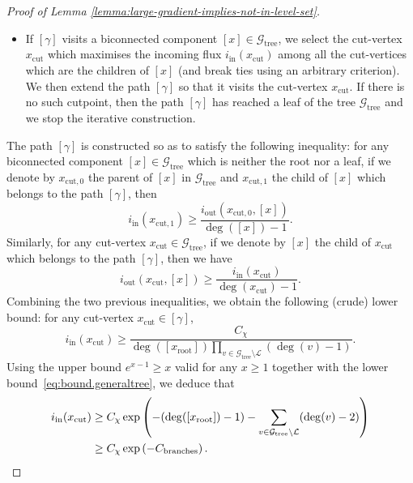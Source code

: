 \documentclass[12pt]{amsart}
\numberwithin{equation}{section}
\begin{document}
\begin{proof}[Proof of Lemma \ref{lemma:large-gradient-implies-not-in-level-set}]
\begin{itemize}
			\item If $[\gamma]$ visits a biconnected component  $[x] \in \mathcal{G}_{\mathrm{tree}}$, we select the cut-vertex $x_{\mathrm{cut}}$ which maximises the incoming flux $i_{\mathrm{in}}(x_{\mathrm{cut}})$ among all the cut-vertices which are the children of $[x]$ (and break ties using an arbitrary criterion). We then extend the path $[\gamma]$ so that it visits the cut-vertex $x_{\mathrm{cut}}$. If there is no such cutpoint, then the path $[\gamma]$ has reached a leaf of the tree $\mathcal{G}_{\mathrm{tree}}$ and we stop the iterative construction.
		\end{itemize}
		The path $[\gamma]$ is constructed so as to satisfy the following inequality: for any biconnected component $[x] \in \mathcal{G}_{\mathrm{tree}}$ which is neither the root nor a leaf, if we denote by $x_{\mathrm{cut},0}$ the parent of $[x]$ in $\mathcal{G}_{\mathrm{tree}}$ and $x_{\mathrm{cut},1}$ the child of $[x]$ which belongs to the path $[\gamma]$, then
		\begin{equation*}
			i_{\mathrm{in}} (x_{\mathrm{cut}, 1}) \geq \frac{i_{\mathrm{out}} (x_{\mathrm{cut}, 0}, [x])}{\deg ([x]) - 1}.
		\end{equation*}
		Similarly, for any cut-vertex $x_{\mathrm{cut}} \in \mathcal{G}_{\mathrm{tree}}$, if we denote by $[x]$ the child of $x_{\mathrm{cut}}$ which belongs to the path $[\gamma]$, then we have
		\begin{equation*}
			i_{\mathrm{out}} (x_{\mathrm{cut}} , [x])  \geq \frac{i_{\mathrm{in}}(x_{\mathrm{cut}})}{\deg (x_{\mathrm{cut}}) - 1}.
		\end{equation*}
		Combining the two previous inequalities, we obtain the following (crude) lower bound: for any cut-vertex $x_{\mathrm{cut}} \in [\gamma]$,
		\begin{equation*}
			i_{\mathrm{in}}(x_{\mathrm{cut}}) \geq \frac{C_{\chi}}{\deg([x_{\mathrm{root}}]) \prod_{v \in \mathcal{G}_{\mathrm{tree}} \setminus \mathcal{L}} (\deg(v) - 1)}.
		\end{equation*}
		Using the upper bound $e^{x - 1} \geq x$ valid for any $x \geq 1$ together with the lower bound~\eqref{eq:bound.generaltree}, we deduce that
		\begin{align} \label{eq:lowerboundiin1410}
			i_{\mathrm{in}}(x_{\mathrm{cut}}) & \geq C_{\chi} \exp \left( - ( \deg([x_{\mathrm{root}}]) - 1) - \sum_{v \in \mathcal{G}_{\mathrm{tree}} \setminus \mathcal{L}} (\deg(v) - 2) \right) \\
			& \geq C_{\chi} \exp \left( -C_{\mathrm{branches}} \right). \notag
		\end{align}
		

\end{proof}
\end{document}
